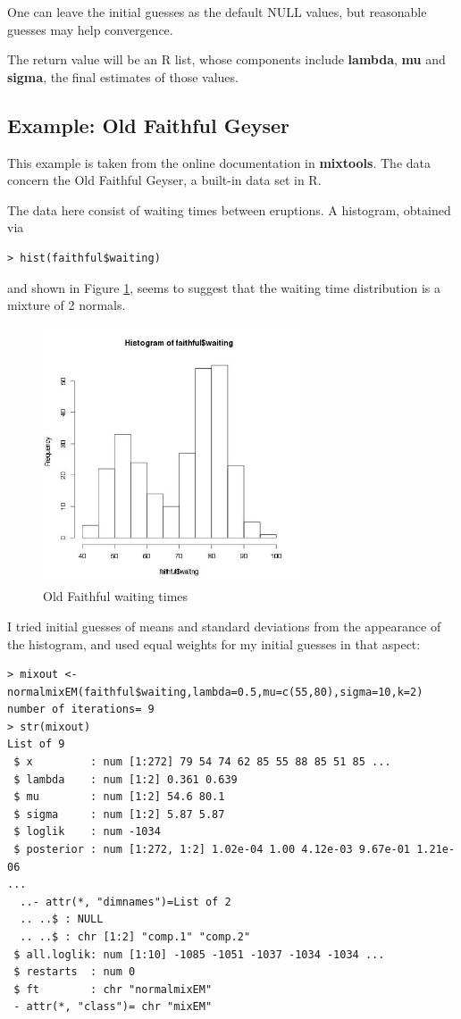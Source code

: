 One can leave the initial guesses as the default NULL values, but
reasonable guesses may help convergence.

The return value will be an R list, whose components include {\bf
lambda}, {\bf mu} and {\bf sigma}, the final estimates of those values.

\subsection{Example:  Old Faithful Geyser}

This example is taken from the online documentation in {\bf mixtools}.
The data concern the Old Faithful Geyser, a built-in data set in R.

The data here consist of waiting times between eruptions.  A histogram,
obtained via 

\begin{lstlisting}
> hist(faithful$waiting)
\end{lstlisting}

and shown in Figure \ref{faithfulhist}, seems to suggest that the
waiting time distribution is a mixture of 2 normals. 

\begin{figure}[tb]
\centerline{
\includegraphics[width=3.0in]{Faithful.jpg}
}
\caption{Old Faithful waiting times}
\label{faithfulhist}
\end{figure}

I tried initial guesses of means and standard deviations from the
appearance of the histogram, and used equal weights for my initial
guesses in that aspect:

\begin{lstlisting}
> mixout <- normalmixEM(faithful$waiting,lambda=0.5,mu=c(55,80),sigma=10,k=2)
number of iterations= 9 
> str(mixout)
List of 9
 $ x         : num [1:272] 79 54 74 62 85 55 88 85 51 85 ...
 $ lambda    : num [1:2] 0.361 0.639
 $ mu        : num [1:2] 54.6 80.1
 $ sigma     : num [1:2] 5.87 5.87
 $ loglik    : num -1034
 $ posterior : num [1:272, 1:2] 1.02e-04 1.00 4.12e-03 9.67e-01 1.21e-06
...
  ..- attr(*, "dimnames")=List of 2
  .. ..$ : NULL
  .. ..$ : chr [1:2] "comp.1" "comp.2"
 $ all.loglik: num [1:10] -1085 -1051 -1037 -1034 -1034 ...
 $ restarts  : num 0
 $ ft        : chr "normalmixEM"
 - attr(*, "class")= chr "mixEM"
\end{lstlisting}

